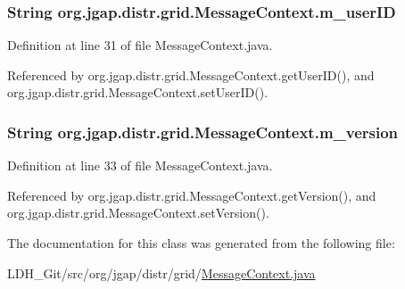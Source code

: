\hypertarget{classorg_1_1jgap_1_1distr_1_1grid_1_1_message_context_ae6f07d428cf91699264f668e6988cd25}{
\subsubsection[{m\-\_\-user\-I\-D}]{\setlength{\rightskip}{0pt plus 5cm}String org.\-jgap.\-distr.\-grid.\-Message\-Context.\-m\-\_\-user\-I\-D\hspace{0.3cm}{\ttfamily [private]}}}\label{classorg_1_1jgap_1_1distr_1_1grid_1_1_message_context_ae6f07d428cf91699264f668e6988cd25}


Definition at line 31 of file Message\-Context.\-java.



Referenced by org.\-jgap.\-distr.\-grid.\-Message\-Context.\-get\-User\-I\-D(), and org.\-jgap.\-distr.\-grid.\-Message\-Context.\-set\-User\-I\-D().

\hypertarget{classorg_1_1jgap_1_1distr_1_1grid_1_1_message_context_a3d365f65a9fb2ae0feffd558337a7c50}{
\subsubsection[{m\-\_\-version}]{\setlength{\rightskip}{0pt plus 5cm}String org.\-jgap.\-distr.\-grid.\-Message\-Context.\-m\-\_\-version\hspace{0.3cm}{\ttfamily [private]}}}\label{classorg_1_1jgap_1_1distr_1_1grid_1_1_message_context_a3d365f65a9fb2ae0feffd558337a7c50}


Definition at line 33 of file Message\-Context.\-java.



Referenced by org.\-jgap.\-distr.\-grid.\-Message\-Context.\-get\-Version(), and org.\-jgap.\-distr.\-grid.\-Message\-Context.\-set\-Version().



The documentation for this class was generated from the following file\-:\begin{DoxyCompactItemize}
\item 
L\-D\-H\-\_\-\-Git/src/org/jgap/distr/grid/\hyperlink{_message_context_8java}{Message\-Context.\-java}\end{DoxyCompactItemize}
